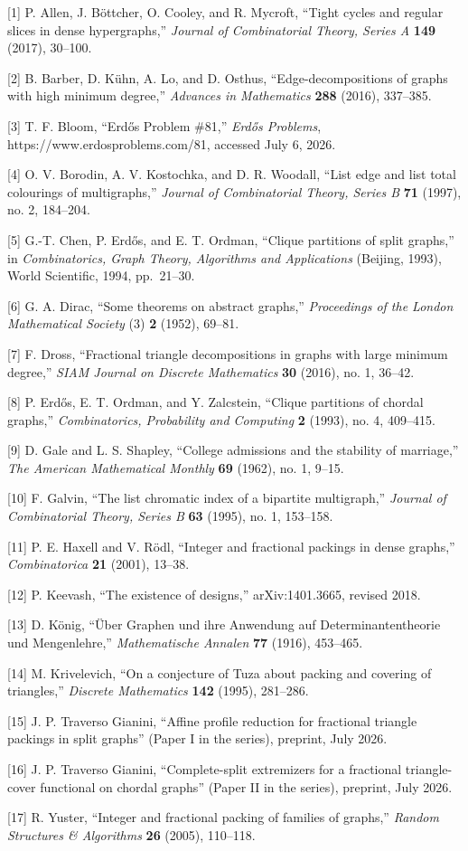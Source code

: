\documentclass[
  american,
  11pt,
  a4paper,
]{article}
\begin{document}
{[}1{]} P. Allen, J. Böttcher, O. Cooley, and R. Mycroft, ``Tight cycles and regular slices in dense hypergraphs,'' \emph{Journal of Combinatorial Theory, Series A} \textbf{149} (2017), 30--100.

{[}2{]} B. Barber, D. Kühn, A. Lo, and D. Osthus, ``Edge-decompositions of graphs with high minimum degree,'' \emph{Advances in Mathematics} \textbf{288} (2016), 337--385.

{[}3{]} T. F. Bloom, ``Erdős Problem \#81,'' \emph{Erdős Problems}, https://www.erdosproblems.com/81, accessed July 6, 2026.

{[}4{]} O. V. Borodin, A. V. Kostochka, and D. R. Woodall, ``List edge and list total colourings of multigraphs,'' \emph{Journal of Combinatorial Theory, Series B} \textbf{71} (1997), no. 2, 184--204.

{[}5{]} G.-T. Chen, P. Erdős, and E. T. Ordman, ``Clique partitions of split graphs,'' in \emph{Combinatorics, Graph Theory, Algorithms and Applications} (Beijing, 1993), World Scientific, 1994, pp.~21--30.

{[}6{]} G. A. Dirac, ``Some theorems on abstract graphs,'' \emph{Proceedings of the London Mathematical Society} (3) \textbf{2} (1952), 69--81.

{[}7{]} F. Dross, ``Fractional triangle decompositions in graphs with large minimum degree,'' \emph{SIAM Journal on Discrete Mathematics} \textbf{30} (2016), no. 1, 36--42.

{[}8{]} P. Erdős, E. T. Ordman, and Y. Zalcstein, ``Clique partitions of chordal graphs,'' \emph{Combinatorics, Probability and Computing} \textbf{2} (1993), no. 4, 409--415.

{[}9{]} D. Gale and L. S. Shapley, ``College admissions and the stability of marriage,'' \emph{The American Mathematical Monthly} \textbf{69} (1962), no. 1, 9--15.

{[}10{]} F. Galvin, ``The list chromatic index of a bipartite multigraph,'' \emph{Journal of Combinatorial Theory, Series B} \textbf{63} (1995), no. 1, 153--158.

{[}11{]} P. E. Haxell and V. Rödl, ``Integer and fractional packings in dense graphs,'' \emph{Combinatorica} \textbf{21} (2001), 13--38.

{[}12{]} P. Keevash, ``The existence of designs,'' arXiv:1401.3665, revised 2018.

{[}13{]} D. König, ``Über Graphen und ihre Anwendung auf Determinantentheorie und Mengenlehre,'' \emph{Mathematische Annalen} \textbf{77} (1916), 453--465.

{[}14{]} M. Krivelevich, ``On a conjecture of Tuza about packing and covering of triangles,'' \emph{Discrete Mathematics} \textbf{142} (1995), 281--286.

{[}15{]} J. P. Traverso Gianini, ``Affine profile reduction for fractional triangle packings in split graphs'' (Paper I in the series), preprint, July 2026.

{[}16{]} J. P. Traverso Gianini, ``Complete-split extremizers for a fractional triangle-cover functional on chordal graphs'' (Paper II in the series), preprint, July 2026.

{[}17{]} R. Yuster, ``Integer and fractional packing of families of graphs,'' \emph{Random Structures \& Algorithms} \textbf{26} (2005), 110--118.
\endgroup
\end{document}
